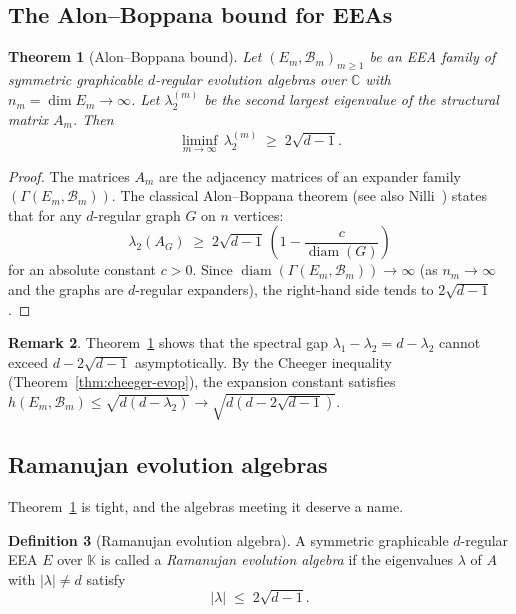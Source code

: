 \documentclass[12pt,a4paper]{amsart}
\newtheorem{theorem}{Theorem}[section]
\theoremstyle{definition}
\newtheorem{definition}[theorem]{Definition}
\newtheorem{remark}[theorem]{Remark}
\DeclareMathOperator{\diam}{diam}
\newcommand{\K}{\mathbb{K}}
\newcommand{\C}{\mathbb{C}}
\newcommand{\hh}{h}          %
\newcommand{\EA}{E}          %
\newcommand{\natbasis}{\mathcal{B}}  %
\newcommand{\strmat}{A}      %
\begin{document}
\subsection{The Alon--Boppana bound for EEAs}


\begin{theorem}[Alon--Boppana bound]\label{thm:alon-boppana}
Let $(\EA_m,\natbasis_m)_{m\ge 1}$ be an EEA family of symmetric
graphicable $d$-regular evolution algebras over $\C$ with
$n_m=\dim\EA_m\to\infty$.  Let $\lambda_2^{(m)}$ be the second largest
eigenvalue of the structural matrix $\strmat_m$.  Then
\[
  \liminf_{m\to\infty}\,\lambda_2^{(m)}
  \;\ge\; 2\sqrt{d-1}.
\]
\end{theorem}

\begin{proof}
The matrices $\strmat_m$ are the adjacency matrices of an expander
family $(\varGamma(\EA_m,\natbasis_m))$.  The classical Alon--Boppana
theorem \cite[Theorem~4.2.x]{Kowalski2019} (see also Nilli~\cite{Nilli1991})
states that for any $d$-regular graph $G$ on $n$ vertices:
\[
  \lambda_2(A_G) \;\ge\; 2\sqrt{d-1}\,\left(1-\frac{c}{\diam(G)}\right)
\]
for an absolute constant $c>0$.  Since $\diam(\varGamma(\EA_m,\natbasis_m))
\to\infty$ (as $n_m\to\infty$ and the graphs are $d$-regular expanders),
the right-hand side tends to $2\sqrt{d-1}$.
\end{proof}

\begin{remark}
Theorem~\ref{thm:alon-boppana} shows that the spectral gap
$\lambda_1-\lambda_2=d-\lambda_2$ cannot exceed $d-2\sqrt{d-1}$
asymptotically.  By the Cheeger inequality
(Theorem~\ref{thm:cheeger-evop}), the expansion constant satisfies
$\hh(\EA_m,\natbasis_m)\le\sqrt{d(d-\lambda_2)}\to\sqrt{d(d-2\sqrt{d-1})}$.
\end{remark}

\subsection{Ramanujan evolution algebras}

Theorem~\ref{thm:alon-boppana} is tight, and the algebras meeting it deserve a name.

\begin{definition}[Ramanujan evolution algebra]\label{def:Ramanujan}
A symmetric graphicable $d$-regular EEA $\EA$ over $\K$ is called a
\emph{Ramanujan evolution algebra} if the eigenvalues $\lambda$ of
$\strmat$ with $|\lambda|\ne d$ satisfy
\[
  |\lambda| \;\le\; 2\sqrt{d-1}.
\]
\end{definition}
\end{document}
